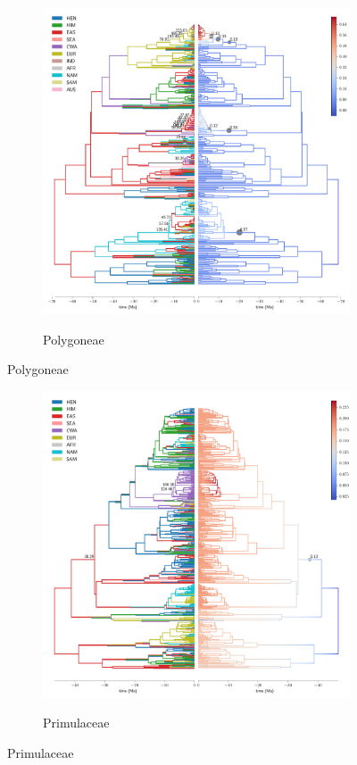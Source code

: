 \begin{figure}
  \ContinuedFloat
\begin{subfigure}{\textwidth}
\centering
\includegraphics[width=.99\linewidth]{figures/Polygoneae-supfig.pdf}
\label{fig:allium}
\caption{Polygoneae}
\end{subfigure}
\end{figure}

\begin{figure}
  \ContinuedFloat
\begin{subfigure}{\textwidth}
\centering
\includegraphics[width=.99\linewidth]{figures/Primulaceae-supfig.pdf}
\label{fig:allium}
\caption{Primulaceae}
\end{subfigure}
\end{figure}

